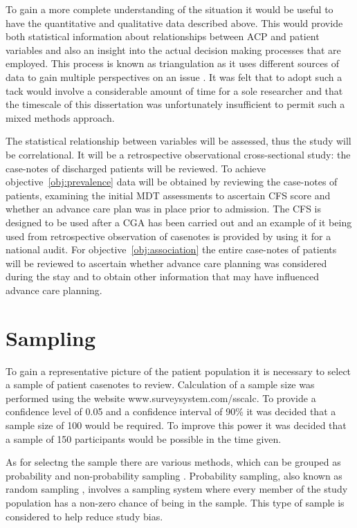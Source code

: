\documentclass
[
	12pt,
	a4paper,
	oneside,
]{report}
\begin{document}
To gain a more complete understanding of the situation it would be useful to 
have the quantitative and qualitative data described above. This would provide
both statistical information about relationships between ACP and patient
variables and also an insight into the actual decision making processes
that are employed. This process is known as triangulation as it uses different
sources of data to gain multiple perspectives on an issue 
\parencite{biggam:15}. It was felt that to adopt such a tack would involve a 
considerable amount of time for a sole researcher and that the timescale of 
this dissertation was unfortunately insufficient to permit such a mixed 
methods approach.

The statistical relationship between variables will be assessed, thus the 
study will be correlational. It will be a retrospective observational 
cross-sectional study: the case-notes of discharged patients will be reviewed.
To achieve objective~\ref{obj:prevalence} data will be obtained by reviewing 
the case-notes of patients, examining the initial MDT assessments to ascertain 
CFS score and whether an advance care plan was in place prior to admission. The
CFS is designed to be used after a CGA has been carried out \parencite{bgs:14}
and an example of it being used from retrospective observation of casenotes is
provided by \textcite{subbe:13} using it for a national audit.
For objective~\ref{obj:association} the entire case-notes of patients 
will be reviewed to ascertain whether advance care planning was considered 
during the stay and to obtain other information that may have influenced
advance care planning.

\section{Sampling}

To gain a representative picture of the patient population it is necessary
to select a sample of patient casenotes to review. Calculation of a sample size 
was performed using the website www.surveysystem.com/sscalc. To provide a confidence
level of 0.05 and a confidence interval of 90\% it was decided that a sample 
size of 100 would be required. To improve this power it was decided that a sample
of 150 participants would be possible in the time given.

As for selectng the sample there are various methods, which can be grouped as 
probability and non-probability sampling \parencite{parahoo:14}. Probability 
sampling, also known as random sampling \parencite{biggam:15}, involves a 
sampling system where every
member of the study population has a non-zero chance of being in the sample.
This type of sample is considered to help reduce study bias.
\end{document}
